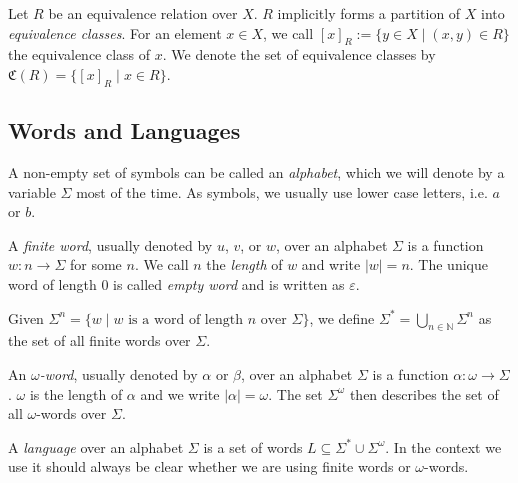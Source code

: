 \begin{defn}
	Let $R$ be an equivalence relation over $X$. $R$ implicitly forms a partition of $X$ into \emph{equivalence classes}. For an element $x \in X$, we call $[x]_R := \{ y \in X \mid (x, y) \in R \}$ the equivalence class of $x$. We denote the set of equivalence classes by $\mathfrak{C}(R) = \{ [x]_R \mid x \in R \}$.
\end{defn}



\subsection{Words and Languages}
\begin{defn}
	A non-empty set of symbols can be called an \emph{alphabet}, which we will denote by a variable $\Sigma$ most of the time. As symbols, we usually use lower case letters, i.e. $a$ or $b$.
	
	A \emph{finite word}, usually denoted by $u$, $v$, or $w$, over an alphabet $\Sigma$ is a function $w : n \rightarrow \Sigma$ for some $n$. We call $n$ the \emph{length} of $w$ and write $|w| = n$. The unique word of length $0$ is called \emph{empty word} and is written as $\varepsilon$.
	
	Given $\Sigma^n = \{ w \mid w \text{ is a word of length } n \text{ over } \Sigma \}$, we define $\Sigma^* = \bigcup\limits_{n \in \mathbb{N}} \Sigma^n$ as the set of all finite words over $\Sigma$. 
\end{defn}

\begin{defn}
	An \emph{$\omega$-word}, usually denoted by $\alpha$ or $\beta$, over an alphabet $\Sigma$ is a function $\alpha : \omega \rightarrow \Sigma$. $\omega$ is the length of $\alpha$ and we write $|\alpha| = \omega$. The set $\Sigma^\omega$ then describes the set of all $\omega$-words over $\Sigma$. 
\end{defn}

\begin{defn}
	A \emph{language} over an alphabet $\Sigma$ is a set of words $L \subseteq \Sigma^* \cup \Sigma^\omega$. In the context we use it should always be clear whether we are using finite words or $\omega$-words.
\end{defn}

